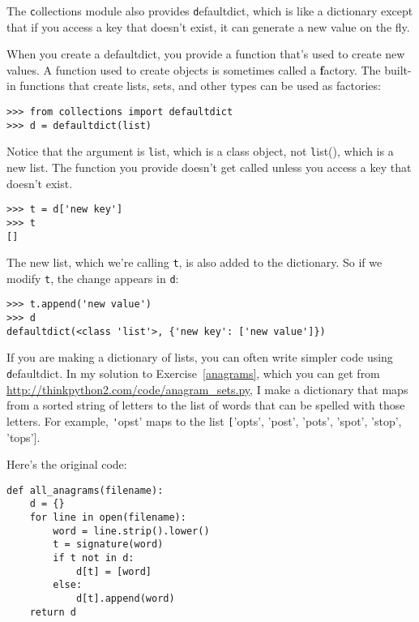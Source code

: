 \documentclass[
DIV=11,
fontsize=12,
twoside,
headinclude=false,
titlepage=firstiscover,
abstract=true,
headsepline=true,
footsepline=true,
chapterprefix=true, %
headings=big,
bibliography=totoc,%
captions=tableheading
]{scrbook}
\theoremstyle{definition}
\begin{document}
The {\texttt collections} module also provides {\texttt defaultdict}, which is
like a dictionary except that if you access a key that doesn't exist,
it can generate a new value on the fly.

When you create a defaultdict, you provide a function that's used to
create new values.  A function used to create objects is sometimes
called a {\textbf factory}.  The built-in functions that create lists, sets,
and other types can be used as factories:

\begin{lstlisting}
>>> from collections import defaultdict
>>> d = defaultdict(list)
\end{lstlisting}

Notice that the argument is {\texttt list}, which is a class object,
not {\texttt list()}, which is a new list.  The function you provide
doesn't get called unless you access a key that doesn't exist.

\begin{lstlisting}
>>> t = d['new key']
>>> t
[]
\end{lstlisting}

The new list, which we're calling {\texttt t}, is also added to the
dictionary.  So if we modify {\texttt t}, the change appears in {\texttt d}:

\begin{lstlisting}
>>> t.append('new value')
>>> d
defaultdict(<class 'list'>, {'new key': ['new value']})
\end{lstlisting}

If you are making a dictionary of lists, you can often write simpler
code using {\texttt defaultdict}.  In my solution to
Exercise~\ref{anagrams}, which you can get from
\url{http://thinkpython2.com/code/anagram_sets.py}, I make a
dictionary that maps from a sorted string of letters to the list of
words that can be spelled with those letters.  For example, {\texttt
  'opst'} maps to the list {\texttt ['opts', 'post', 'pots', 'spot',
    'stop', 'tops']}.

Here's the original code:

\begin{lstlisting}
def all_anagrams(filename):
    d = {}
    for line in open(filename):
        word = line.strip().lower()
        t = signature(word)
        if t not in d:
            d[t] = [word]
        else:
            d[t].append(word)
    return d
\end{lstlisting}
\end{document}
